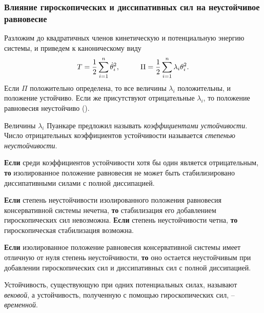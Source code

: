 \subsubsection*{Влияние гироскопических и диссипативных сил на
неустойчивое равновесие}

Разложим до квадратичных членов кинетическую и потенциальную энергию системы, и приведем к каноническому виду
\begin{equation*}
    T = \frac{1}{2}\sum_{i=1}^n \dot{\theta}_i^2,
    \hspace{1 cm}
    \Pi = \frac{1}{2} \sum_{i=1}^{n} \lambda_i \theta_i^2.
\end{equation*}
Если $\Pi$ положительно определена, то все величины $\lambda_i$ положительны, и положение устойчиво. Если же присутствуют отрицательные $\lambda_i$, то положение равновесия неустойчиво (). 

\begin{to_def}
    Величины $\lambda_i$ Пуанкаре предложил называть \textit{коэффициентами устойчивости}. Число отрицательных коэффициентов устойчивости называется \textit{степенью неустойчивости}. 
\end{to_def}


\begin{to_thr}[]
    \textbf{Если} среди коэффициентов устойчивости хотя бы один является отрицательным, \textbf{то} изолированное положение равновесия не может быть стабилизировано диссипативными силами с полной диссипацией.
\end{to_thr}

\begin{to_thr}[]
    \textbf{Если} степень неустойчивости изолированного положения равновесия консервативной системы нечетна, \textbf{то} стабилизация его добавлением гироскопических сил невозможна. \textbf{Если} степень неустойчивости четна, \textbf{то} гироскопическая стабилизация возможна.
\end{to_thr}

\begin{to_thr}[]
    \textbf{Если} изолированное положение равновесия консервативной системы имеет отличную от нуля степень неустойчивости, \textbf{то} оно остается неустойчивым при добавлении гироскопических сил и диссипативных сил с полной диссипацией.
\end{to_thr}

\begin{to_def}
    Устойчивость, существующую при одних потенциальных силах, называют \textit{вековой}, а устойчивость, полученную с помощью гироскопических сил, -- \textit{временной}.
\end{to_def}